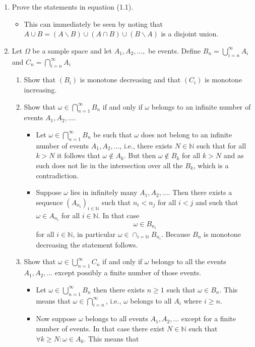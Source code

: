 \documentclass{article}
\begin{document}
\begin{enumerate}
	\item Prove the statements in equation (1.1).
		\begin{itemize}
			\item This can immediately be seen by noting that $A \cup B = (A \backslash B) \cup (A \cap B) \cup (B \backslash A)$ is a disjoint union.
		\end{itemize}
	\item Let $\Omega$ be a sample space and let $A_1, A_2, \dots, $ be events. Define $B_n = \bigcup_{i = n}^\infty A_i$ and $C_n = \bigcap_{i = n}^\infty A_i$
		\begin{enumerate}
			\item Show that $(B_i)$ is monotone decreasing and that $(C_i)$ is monotone increasing.
			\item Show that $\omega \in \bigcap_{n = 1}^\infty B_n$ if and only if $\omega$ belongs to an infinite number of events $A_1, A_2, \dots$.
				\begin{itemize}
					\item Let $\omega \in \bigcap_{n = 1}^\infty B_n$ be such that $\omega$ does not belong to an infinite number of events $A_1, A_2, \dots$, i.e., there exists $N \in \mathbb{N}$ such that for all $k > N$ it follows that $\omega \notin A_k$. But then $\omega \notin B_k$ for all $k > N$ and as such does not lie in the intersection over all the $B_k$, which is a contradiction.
					\item Suppose $\omega$ lies in infinitely many $A_1, A_2, ...$. Then there exists a sequence $(A_{n_i})_{i \in \mathbb{N}}$ such that $n_i < n_{j}$ for all $i < j$ and such that $\omega \in A_{n_i}$ for all $i \in \mathbb{N}$. In that case
					$$
					\omega \in B_{n_i}
					$$
					for all $i \in \mathbb{N}$, in particular $\omega \in \cap_{i = \mathbb{N}} B_{n_i}$. Because $B_n$ is monotone decreasing the statement follows.
				\end{itemize}
			\item Show that $\omega \in \bigcup_{n = 1}^\infty C_n$ if and only if $\omega$ belongs to all the events $A_1, A_2, \dots$ except possibly a finite number of those events.
				\begin{itemize}
					\item Let $\omega \in \bigcup_{n = 1}^\infty B_n$ then there exists $n \geq 1$ such that $\omega \in B_n$. This means that $\omega \in \bigcap_{i = n}^\infty$, i.e., $\omega$ belongs to all $A_i$ where $i \geq n$.
					\item Now suppose $\omega$ belongs to all events $A_1, A_2, \dots$ except for a finite number of events. In that case there exist $N \in \mathbb{N}$ such that $\forall k \geq N : \omega \in A_k$. This means that

\end{itemize}
\end{enumerate}
\end{enumerate}
\end{document}
